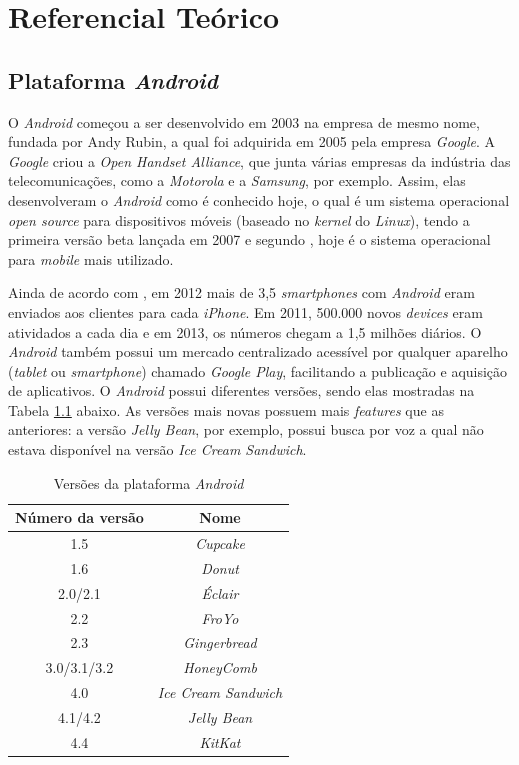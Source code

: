 \chapter[Referencial Teórico]{Referencial Teórico}
\label{refteorico}

\section{Plataforma \textit{Android}}

	O \textit{Android} começou a ser desenvolvido em 2003 na empresa de mesmo nome, fundada por Andy Rubin, a qual foi adquirida em 2005 pela empresa \textit{Google}. A \textit{Google} criou a \textit{Open Handset Alliance}, que junta várias empresas da indústria das telecomunicações, como a \textit{Motorola} e a \textit{Samsung}, por exemplo. Assim, elas desenvolveram o \textit{Android} como é conhecido hoje, o qual é um sistema operacional  \textit{open source} para dispositivos móveis (baseado no \textit{kernel} do \textit{Linux}), tendo a primeira versão beta lançada em 2007 e segundo \cite{android2013}, hoje é o sistema operacional para \textit{mobile} mais utilizado.

	 Ainda de acordo com \cite{android2013}, em 2012 mais de 3,5 \textit{smartphones} com \textit{Android} eram enviados aos clientes para cada \textit{iPhone}. Em 2011, 500.000 novos \textit{devices} eram atividados a cada dia e em 2013, os números chegam a 1,5 milhões diários. O \textit{Android} também possui um mercado centralizado acessível por qualquer aparelho (\textit{tablet} ou \textit{smartphone}) chamado \textit{Google Play}, facilitando a publicação e aquisição de aplicativos. 
	O \textit{Android}  possui diferentes versões, sendo elas mostradas na Tabela \ref{androidTab} abaixo.  As versões mais novas possuem mais \textit{features} que as anteriores: a versão \textit{Jelly Bean}, por exemplo, possui busca por voz a qual não estava disponível na versão \textit{Ice Cream Sandwich}. 

\begin{table}[h]
	\centering	
	\begin{tabular}{cc}
		\toprule
		\textbf{Número da versão} & \textbf{Nome}  \\
		\midrule
		1.5 &  \textit{Cupcake} \\
		1.6 & \textit{Donut} \\
		2.0/2.1 &  \textit{Éclair} \\
		2.2 & \textit{FroYo} \\
		2.3 &  \textit{Gingerbread} \\
		3.0/3.1/3.2 & \textit{HoneyComb} \\
		4.0 & \textit{Ice Cream Sandwich} \\
		4.1/4.2 & \textit{Jelly Bean} \\
		4.4 &  \textit{KitKat} \\

		\bottomrule
	\end{tabular}
	\caption{ Versões da plataforma \textit{Android}}
	\label{androidTab}
\end{table}

